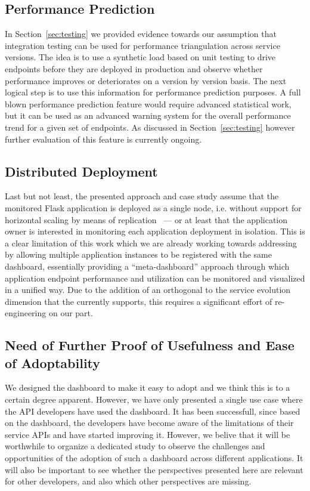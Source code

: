   \subsection*{Performance Prediction}

	In Section~\ref{sec:testing} we provided evidence towards our assumption that integration testing can be used for performance triangulation across service versions. The idea is to use a synthetic load based on unit testing to drive endpoints before they are deployed in production and observe whether performance improves or deteriorates on a version by version basis. The next logical step is to use this information for performance prediction purposes. A full blown performance prediction feature would require advanced statistical work, but it can be used as an advanced warning system for the overall performance trend for a given set of endpoints. As discussed in Section~\ref{sec:testing} however further evaluation of this feature is currently ongoing.

  \subsection*{Distributed Deployment}

	Last but not least, the presented approach and case study assume that the monitored Flask application is deployed as a single node, i.e. without support for horizontal scaling by means of replication~\cite{vaquero2011dynamically}  --- or at least that the application owner is interested in monitoring each application deployment in isolation. This is a clear limitation of this work which we are already working towards addressing by allowing multiple application instances to be registered with the same dashboard, essentially providing a ``meta-dashboard'' approach through which application endpoint performance and utilization can be monitored and visualized in a unified way. Due to the addition of an orthogonal to the service evolution dimension that the \tool currently supports, this requires a significant effort of re-engineering on our part.   
	


  \subsection*{Need of Further Proof of Usefulness and Ease of Adoptability}

    We designed the dashboard to make it easy to adopt and we think this is to a certain degree apparent. However, we have only presented a single use case where the API developers have used the dashboard. It has been successfull, since based on the dashboard, the developers have become aware of the limitations of their service APIs and have started improving it. However, we belive that it will be worthwhile to organize a dedicated study to observe the challenges and opportunities of the adoption of such a dashboard across different applications. It will also be important to see whether the perspectives presented here are relevant for other developers, and also which other perspectives are missing.
  
